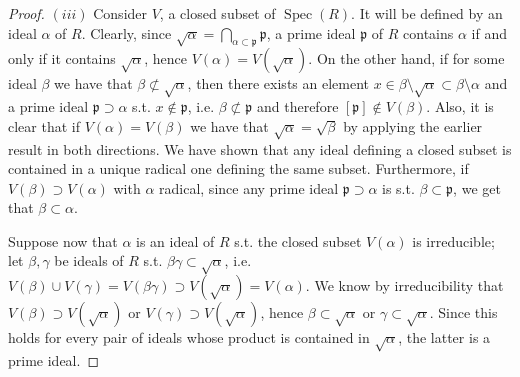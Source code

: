 \documentclass{article}
\newcommand{\pid}{\mathfrak{p}}
\newcommand{\exercise}[1]{\noindent {\bf Exercise #1}}
\DeclareMathOperator{\Spec}{Spec}
\begin{document}
\begin{proof}
$(iii)$ Consider $V$, a closed subset of $\Spec(R)$. It will be defined
by an ideal $\alpha$ of $R$. Clearly, since
$\sqrt{\alpha}=\bigcap_{\alpha\subset\pid} \pid$, a prime ideal $\pid$ of $R$
contains $\alpha$ if and only if it contains $\sqrt{\alpha}$, hence
$V(\alpha)=V(\sqrt{\alpha})$. On the other hand, if for some ideal $\beta$ we
have that $\beta\not\subset\sqrt{\alpha}$, then there exists an element 
$x\in\beta\setminus\sqrt{\alpha}\subset\beta\setminus\alpha$ and a prime ideal
$\pid\supset\alpha$ s.t. $x\not\in\pid$, i.e. $\beta\not\subset\pid$ and
therefore $[\pid]\not\in V(\beta)$. Also, it is clear that if $V(\alpha)=
V(\beta)$ we have that $\sqrt{\alpha}=\sqrt{\beta}$ by applying the earlier
result in both directions. We have shown that any ideal defining a closed
subset is contained in a unique
radical one defining the same subset. Furthermore, if $V(\beta)\supset
V(\alpha)$ with $\alpha$ radical, since any prime ideal $\pid\supset\alpha$ is
s.t. $\beta\subset\pid$, we get that $\beta\subset\alpha$.

Suppose now that $\alpha$ is an ideal of $R$ s.t. the closed subset $V(\alpha)$ is
irreducible; let $\beta,\gamma$ be ideals of $R$ s.t.
$\beta\gamma\subset\sqrt{\alpha}$, i.e. $V(\beta)\cup V(\gamma)=V(\beta\gamma)\supset
V(\sqrt{\alpha})=V(\alpha)$.
We know by irreducibility that $V(\beta)\supset V(\sqrt{\alpha})$ or
$V(\gamma)\supset V(\sqrt{\alpha})$, hence
$\beta\subset\sqrt{\alpha}$ or $\gamma\subset\sqrt{\alpha}$. Since this holds
for every pair of ideals whose product is contained in $\sqrt{\alpha}$, the
latter is a prime ideal.
\end{proof}


~\\
\exercise{2}
\end{document}
